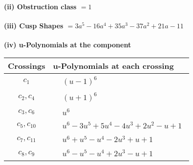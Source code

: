 \documentclass[1p]{elsarticle_modified}
\theoremstyle{definition}
\begin{document}
\flushleft \textbf{(ii) Obstruction class $= 1$}\\~\\
\flushleft \textbf{(iii) Cusp Shapes $= 3 a^5-16 a^4+35 a^3-37 a^2+21 a-11$}\\~\\
\newpage\renewcommand{\arraystretch}{1}
\flushleft \textbf{(iv) u-Polynomials at the component}\newline \\
\begin{tabular}{m{50pt}|m{274pt}}
Crossings & \hspace{64pt}u-Polynomials at each crossing \\
\hline $$\begin{aligned}c_{1}\end{aligned}$$&$\begin{aligned}
&(u-1)^6
\end{aligned}$\\
\hline $$\begin{aligned}c_{2},c_{4}\end{aligned}$$&$\begin{aligned}
&(u+1)^6
\end{aligned}$\\
\hline $$\begin{aligned}c_{3},c_{6}\end{aligned}$$&$\begin{aligned}
&u^6
\end{aligned}$\\
\hline $$\begin{aligned}c_{5},c_{10}\end{aligned}$$&$\begin{aligned}
&u^6-3 u^5+5 u^4-4 u^3+2 u^2- u+1
\end{aligned}$\\
\hline $$\begin{aligned}c_{7},c_{11}\end{aligned}$$&$\begin{aligned}
&u^6+u^5- u^4-2 u^3+u+1
\end{aligned}$\\
\hline $$\begin{aligned}c_{8},c_{9}\end{aligned}$$&$\begin{aligned}
&u^6- u^5- u^4+2 u^3- u+1
\end{aligned}$\\
\hline
\end{tabular}\\~\\
\end{document}

